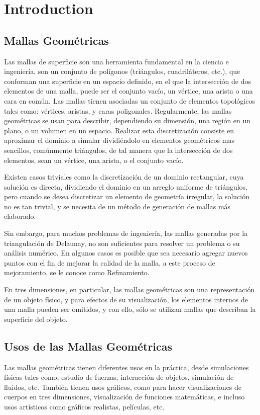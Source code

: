 \chapter{Introduction}
\label{ch:introduction}

\section{Mallas Geométricas}
\label{sec:mallasGeometricas}
Las mallas de superficie son una herramienta fundamental en la ciencia e ingeniería, son
un conjunto de polígonos (triángulos, cuadriláteros, etc.), que conforman una superficie en un
espacio definido, en el que la intersección de dos elementos de una malla, puede ser el conjunto
vacío, un vértice, una arista o una cara en común. Las mallas tienen asociadas un conjunto de
elementos topológicos tales como: vértices, aristas, y caras poligonales.
Regularmente, las mallas geométricas se usan para describir, dependiendo su dimensión,
una región en un plano, o un volumen en un espacio. Realizar esta discretización consiste en
aproximar el dominio a simular dividiéndolo en elementos geométricos mas sencillos,
comúnmente triángulos, de tal manera que la intersección de dos elementos, sean un vértice, una
arista, o el conjunto vacío.

Existen casos triviales como la discretización de un dominio rectangular, cuya solución es
directa, dividiendo el dominio en un arreglo uniforme de triángulos, pero cuando se desea
discretizar un elemento de geometría irregular, la solución no es tan trivial, y se necesita de un
método de generación de mallas más elaborado.

Sin embargo, para muchos problemas de ingeniería, las mallas generadas por la
triangulación de Delaunay\cite{Delaunay1934}, no son suficientes para resolver un problema o su análisis numérico. En algunos casos es posible que sea necesario agregar nuevos puntos con el fin de mejorar la
calidad de la malla, a este proceso de mejoramiento, se le conoce como Refinamiento.

En tres dimensiones, en particular, las mallas geométricas son una representación de un
objeto físico, y para efectos de su visualización, los elementos internos de una malla pueden ser
omitidos, y con ello, sólo se utilizan mallas que describan la superficie del objeto.

\section{Usos de las Mallas Geométricas}
\label{sec:usosDeLasMallasGeometricas}
Las mallas geométricas tienen diferentes usos en la práctica, desde simulaciones físicas
tales como, estudio de fuerzas, interacción de objetos, simulación de fluidos, etc. También tienen
usos gráficos, como para hacer visualizaciones de cuerpos en tres dimensiones, visualización de
funciones matemáticas, e incluso usos artísticos como gráficos realistas, películas, etc.


